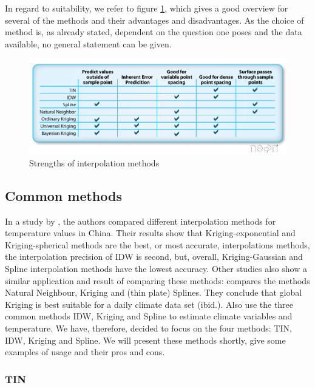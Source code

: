 In regard to suitability, we refer to figure \ref{fig:interpolation_methods_strengths}, which gives a good overview for several of the methods and their advantages and disadvantages. As the choice of method is, as already stated, dependent on the question one poses and the data available, no general statement can be given.


\begin{figure}[b!]
	\includegraphics[width=\linewidth]{images/interpolation_methods_strengths.png}
	\caption{Strengths of interpolation methods \cite{wasser_going_2020}}
	\label{fig:interpolation_methods_strengths}
\end{figure}

\subsection{Common methods}

In a study by \citeauthor{wenjing_cao_study_2009}, the authors compared different interpolation methods for temperature values in China. Their results show that Kriging-exponential and Kriging-spherical methods are the best, or most accurate, interpolations methods, the interpolation precision of IDW is second, but, overall, Kriging-Gaussian and Spline interpolation methods have the lowest accuracy. \cite{wenjing_cao_study_2009} Other studies also show a similar application and result of comparing these methods: 
\citeauthor{hofstra_comparison_2008} compares the methods Natural Neighbour, Kriging and (thin plate) Splines. They conclude that global Kriging is best suitable for a daily climate data set (ibid.). Also \citeauthor{samanta_interpolation_2012} use the three common methods IDW, Kriging and Spline to estimate climate variables and temperature.
We have, therefore, decided to focus on the four methods: TIN, IDW, Kriging and Spline. We will present these methods shortly, give some examples of usage and their pros and cons.

\subsubsection{TIN}

